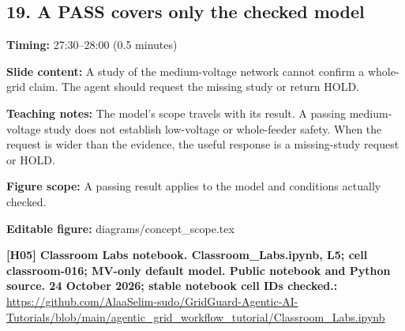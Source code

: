 \documentclass[10pt,letterpaper]{article}
\begin{document}
\subsection*{19. A PASS covers only the checked model}
\textbf{Timing:} 27:30--28:00 (0.5 minutes)\par
\textbf{Slide content:} A study of the medium-voltage network cannot confirm a whole-grid claim.
The agent should request the missing study or return HOLD.\par
\textbf{Teaching notes:} The model's scope travels with its result. A passing medium-voltage study does not establish low-voltage or whole-feeder safety. When the request is wider than the evidence, the useful response is a missing-study request or HOLD.\par
\textbf{Figure scope:} A passing result applies to the model and conditions actually checked.\par
\textbf{Editable figure:} diagrams/concept\_scope.tex\par
\textbf{[H05] Classroom Labs notebook. Classroom\_Labs.ipynb, L5; cell classroom-016; MV-only default model. Public notebook and Python source. 24 October 2026; stable notebook cell IDs checked.:} \href{https://github.com/AlaaSelim-sudo/GridGuard-Agentic-AI-Tutorials/blob/main/agentic_grid_workflow_tutorial/Classroom_Labs.ipynb}{\small\ttfamily https:/\allowbreak{}/\allowbreak{}github.\allowbreak{}com/\allowbreak{}AlaaSelim-\allowbreak{}sudo/\allowbreak{}GridGuard-\allowbreak{}Agentic-\allowbreak{}AI-\allowbreak{}Tutorials/\allowbreak{}blob/\allowbreak{}main/\allowbreak{}agentic\_\allowbreak{}grid\_\allowbreak{}workflow\_\allowbreak{}tutorial/\allowbreak{}Classroom\_\allowbreak{}Labs.\allowbreak{}ipynb}\par
\par\medskip
\end{document}
